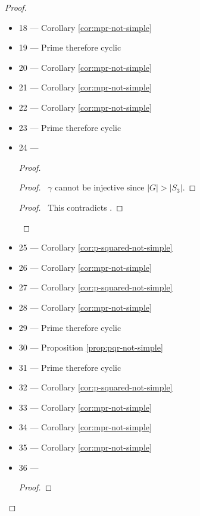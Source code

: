 \begin{proof}
\begin{itemize}
\item 18 --- Corollary \ref{cor:mpr-not-simple}
\item 19 --- Prime therefore cyclic
\item 20 --- Corollary \ref{cor:mpr-not-simple}
\item 21 --- Corollary \ref{cor:mpr-not-simple}
\item 22 --- Corollary \ref{cor:mpr-not-simple}
\item 23 --- Prime therefore cyclic
\item 24 ---
\begin{proof}
	\begin{proof}
		\pf\ $\gamma$ cannot be injective since $|G| > |S_3|$.
	\end{proof}
	\qedstep
	\begin{proof}
		\pf\ This contradicts .
	\end{proof}
\end{proof}
\item 25 --- Corollary \ref{cor:p-squared-not-simple}
\item 26 --- Corollary \ref{cor:mpr-not-simple}
\item 27 --- Corollary \ref{cor:p-squared-not-simple}
\item 28 --- Corollary \ref{cor:mpr-not-simple}
\item 29 --- Prime therefore cyclic
\item 30 --- Proposition \ref{prop:pqr-not-simple} 
\item 31 --- Prime therefore cyclic
\item 32 --- Corollary \ref{cor:p-squared-not-simple}
\item 33 --- Corollary \ref{cor:mpr-not-simple}
\item 34 --- Corollary \ref{cor:mpr-not-simple}
\item 35 --- Corollary \ref{cor:mpr-not-simple}
\item 36 ---
\begin{proof}

\end{proof}
\end{itemize}
\end{proof}
